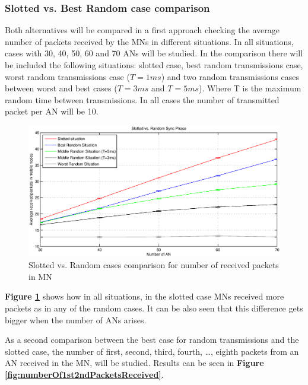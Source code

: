 \subsubsection{Slotted vs. Best Random case comparison}

Both alternatives will be compared in a first approach checking the average number of packets received by the \acp{MN} in different situations. In 
all situations, cases with 30, 40, 50, 60 and 70 \acp{AN} will be studied. In the comparison there will be included the following situations: 
slotted case, best random transmissions case, worst random transmissions case ($T=1 ms$) and two random transmissions cases between worst and best cases
($T=3ms$ and $T=5ms$). Where T is the maximum random time between transmissions. In all cases the number of transmitted packet per \ac{AN} will be 10.

\begin{figure}[ht]
 \begin{center}
  \includegraphics[width=1\textwidth]{slottedVsRandomAverageReceivedPackets.eps}
 \end{center}
 \caption{Slotted vs. Random cases comparison for number of received packets in \ac{MN}}
 \label{fig:slottedVsRandomAverageReceivedPackets}
\end{figure}

\textbf{Figure \ref{fig:slottedVsRandomAverageReceivedPackets}} shows how in all situations, in the slotted case \acp{MN} received more packets as in
any of the random cases. It can be also seen that this difference gets bigger when the number of \acp{AN} arises.

As a second comparison between the best case for random transmissions and the slotted case, the number of first, second, third, fourth, \ldots, eighth
packets from an \ac{AN} received in the \ac{MN}, will be studied. Results can be seen in \textbf{Figure \ref{fig:numberOf1st2ndPacketsReceived}}.

